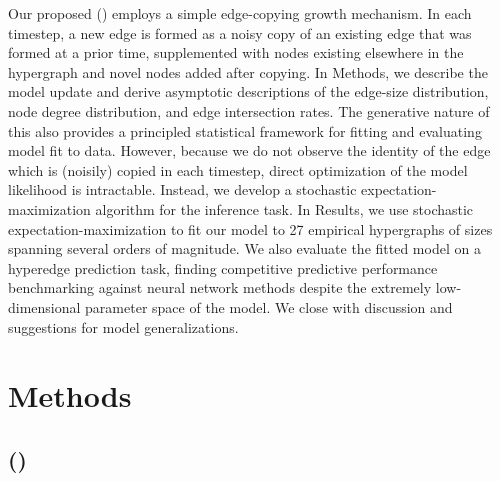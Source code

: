 Our proposed \Model (\model) employs a simple edge-copying growth mechanism. 
In each timestep, a new edge is formed as a noisy copy of an existing edge that was formed at a prior time, supplemented with nodes existing elsewhere in the hypergraph and novel nodes added after copying. 
In Methods, we describe the model update and derive asymptotic descriptions of the edge-size distribution, node degree distribution, and edge intersection rates. 
The generative nature of this \model also provides a principled statistical framework for fitting and evaluating model fit to data. 
However, because we do not observe the identity of the edge which is (noisily) copied in each timestep, direct optimization of the model likelihood is intractable. 
Instead, we develop a stochastic expectation-maximization algorithm \cite{cappeOnLineExpectationMaximization2009} for the inference task. 
In Results, we use stochastic expectation-maximization to fit our model to 27 empirical hypergraphs of sizes spanning several orders of magnitude.  
We also evaluate the fitted model on a hyperedge prediction task, finding competitive predictive performance benchmarking against neural network methods despite the extremely low-dimensional parameter space of the model. 
We close with discussion and suggestions for model generalizations. 
     
   
\section*{Methods}

\subsection*{\Model (\model)} \label{sec:model}

